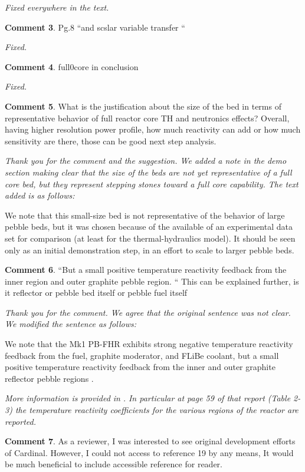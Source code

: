 \documentclass{nseJournal}
\begin{document}
\textit{Fixed everywhere in the text.}

\textbf{Comment 3}. Pg.8 “and scslar variable transfer “

\textit{Fixed.}

\textbf{Comment 4}. full0core in conclusion

\textit{Fixed.}

\textbf{Comment 5}. What is the justification about the size of the bed in terms of representative behavior of full reactor core TH and neutronics effects? Overall, having higher resolution power profile, how
much reactivity can add or how much sensitivity are there, those can be good next step
analysis.

\textit{Thank you for the comment and the suggestion. We added a note in the demo section making clear that the size of the beds are not yet representative of a full core bed, but they represent stepping stones toward a full core capability. The text added is as follows: }

We note that this small-size bed is not representative of the behavior of large pebble beds,
but it was chosen because of the available of an experimental data set for comparison (at least for the thermal-hydraulics model). It should be seen only as an initial demonstration step, in an effort to scale to larger pebble beds.

\textbf{Comment 6}. “But a small positive temperature reactivity feedback from the inner region and outer graphite pebble region. “ This can be explained further, is it reflector or pebble bed itself or pebble fuel itself

\textit{Thank you for the comment. We agree that the original sentence was not clear. We modified the sentence as follows:}

We note that the Mk1 PB-FHR exhibits strong negative temperature reactivity feedback from the fuel, graphite moderator, and FLiBe coolant, but a small positive temperature reactivity feedback from the inner  and outer graphite reflector pebble regions \cite{cisneros2014technical}.

\textit{More information is provided in } \cite{cisneros2014technical} \textit{. In particular at page 59 of that report (Table 2-3) the temperature reactivity coefficients for the various regions of the reactor are reported.}

\textbf{Comment 7}. As a reviewer, I was interested to see original development efforts of Cardinal. However, I could not
access to reference 19 by any means, It would be much beneficial to include accessible reference for
reader.
\end{document}
